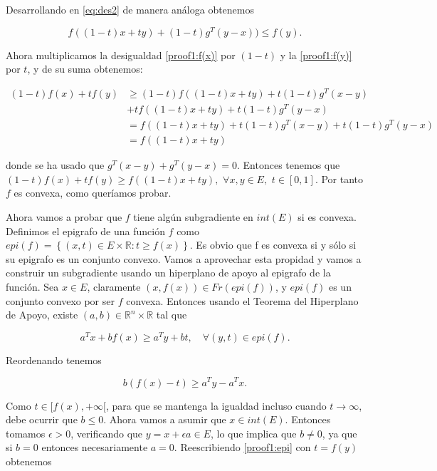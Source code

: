 Desarrollando en \ref{eq:des2} de manera análoga obtenemos

\begin{equation}\label{proof1:f(y)}
    f((1-t)x + ty) + (1-t)g^T(y-x)) \leq f(y).
\end{equation}

Ahora multiplicamos la desigualdad \ref{proof1:f(x)} por $(1-t)$ y la \ref{proof1:f(y)} por $t$, y de su suma obtenemos:

\begin{align*}
	(1-t)f(x) + tf(y) &\geq  (1-t)f((1-t)x+ty) + t(1-t)g^T(x-y) \\
	&+ tf((1-t)x+ty) + t(1-t)g^T(y-x) \\
	 &= f((1-t)x + ty) + t(1-t) g^T(x-y) + t(1-t)g^T(y-x) \\
	&= f((1-t)x+ty)
\end{align*}

donde se ha usado que $g^T(x-y) + g^T(y-x)=0$. Entonces tenemos que $(1-t)f(x) + tf(y) \geq f((1-t)x + ty), $ $ \forall x,y \in E, $ $ t \in [0,1]$. Por tanto $f$ es convexa, como queríamos probar.

Ahora vamos a probar que $f$ tiene algún subgradiente en $int(E)$ si es convexa. Definimos el epigrafo de una función $f$ como $epi(f)=\left \{ (x,t) \in E \times \mathbb{R} : t \geq f(x) \right \}$. Es obvio que f es convexa si y sólo si su epigrafo es un conjunto convexo. Vamos a aprovechar esta propidad y vamos a construir un subgradiente usando un hiperplano de apoyo al epigrafo de la función. Sea $x \in E$, claramente $(x, f(x)) \in Fr(epi(f))$, y $epi(f)$ es un conjunto convexo por ser $f$ convexa. Entonces usando el Teorema del Hiperplano de Apoyo, existe $(a,b) \in \mathbb{R}^n \times \mathbb{R}$ tal que

\begin{equation}\label{proof1:epi}
    a^Tx + bf(x) \geq a^Ty + bt, \quad \forall (y,t) \in epi(f).
\end{equation}

Reordenando tenemos

$$b(f(x)-t) \geq a^Ty - a^Tx.$$

Como $t \in [f(x), + \infty [$, para que se mantenga la igualdad incluso cuando $t \rightarrow \infty$, debe ocurrir que $b\leq 0$. Ahora vamos a asumir que $x \in int(E)$. Entonces tomamos $\epsilon > 0$, verificando que $y=x+\epsilon a \in E$, lo que implica que $b\neq 0$, ya que si $b=0$ entonces necesariamente $a=0$. Reescribiendo \ref{proof1:epi} con $t=f(y)$ obtenemos

